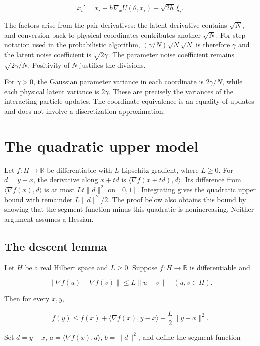 \documentclass[11pt,a4paper]{article}
\begin{document}
\[x_i'=x_i-h\nabla_xU(\theta,x_i)+\sqrt{2h}\,\xi_i.\]

The factors arise from the pair derivatives: the latent derivative contains \(\sqrt N\), and conversion back to physical coordinates contributes another \(\sqrt N\). For step notation used in the probabilistic algorithm, \((\gamma/N)\sqrt N\sqrt N\) is therefore \(\gamma\) and the latent noise coefficient is \(\sqrt{2\gamma}\). The parameter noise coefficient remains \(\sqrt{2\gamma/N}\). Positivity of \(N\) justifies the divisions.



For \(\gamma>0\), the Gaussian parameter variance in each coordinate is \(2\gamma/N\), while each physical latent variance is \(2\gamma\). These are precisely the variances of the interacting particle updates. The coordinate equivalence is an equality of updates and does not involve a discretization approximation.




\section{\texorpdfstring{The quadratic upper model}{The quadratic upper model}}


Let \(f:H\to\mathbb R\) be differentiable with \(L\)-Lipschitz gradient, where \(L\ge0\). For \(d=y-x\), the derivative along \(x+td\) is \(\langle\nabla f(x+td),d\rangle\). Its difference from \(\langle\nabla f(x),d\rangle\) is at most \(Lt\|d\|^2\) on \([0,1]\). Integrating gives the quadratic upper bound with remainder \(L\|d\|^2/2\). The proof below also obtains this bound by showing that the segment function minus this quadratic is nonincreasing. Neither argument assumes a Hessian.


\subsection{\texorpdfstring{The descent lemma}{The descent lemma}}


Let \(H\) be a real Hilbert space and \(L\ge0\). Suppose \(f:H\to\mathbb R\) is differentiable and

\[\|\nabla f(u)-\nabla f(v)\|\le L\|u-v\|\quad(u,v\in H).\]

Then for every \(x,y\),

\[f(y)\le f(x)+\langle\nabla f(x),y-x\rangle+\frac L2\|y-x\|^2.\]

Set \(d=y-x\), \(a=\langle\nabla f(x),d\rangle\), \(b=\|d\|^2\), and define the segment function
\end{document}
